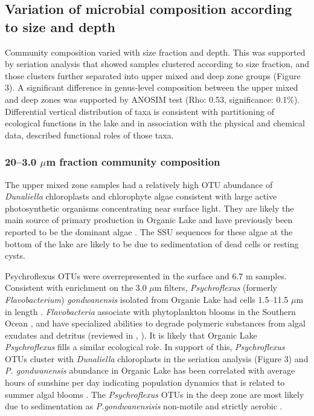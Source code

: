 \subsection{Variation of microbial composition according to size and depth}
Community composition varied with size fraction and depth. 
This was supported by seriation analysis that showed samples clustered according to size fraction, and those clusters further separated into upper mixed and deep zone groups (Figure 3). 
A significant difference in genus-level composition between the upper mixed and deep zones was supported by \ac{ANOSIM} test (Rho: 0.53, significance: 0.1\%). 
Differential vertical distribution of taxa is consistent with partitioning of ecological functions in the lake and in association with the physical and chemical data, described functional roles of those taxa.

\subsubsection{20--3.0 $\mu$m fraction community composition}
The upper mixed zone samples had a relatively high \ac{OTU} abundance of \emph{Dunaliella} chloroplasts and chlorophyte algae consistent with large active photosynthetic organisms concentrating near surface light. 
They are likely the main source of primary production in Organic Lake and have previously been reported to be the dominant algae \cite{Franzmann1987b}. 
The \ac{SSU} sequences for these algae at the bottom of the lake are likely to be due to sedimentation of dead cells or resting cysts.

Psychroflexus \acp{OTU} were overrepresented in the surface and 6.7 m samples. 
Consistent with enrichment on the 3.0 $\mu$m filters, \emph{Psychroflexus} (formerly \emph{Flavobacterium}) \emph{gondwanensis} \cite{Bowman1998} isolated from Organic Lake \cite{Franzmann1987b} had cells 1.5--11.5 $\mu$m in length \cite{Dobson1991}. 
\emph{Flavobacteria} associate with phytoplankton blooms in the Southern Ocean \cite{Abell2005a, Abell2005b, Williams2012b}, and have specialized abilities to degrade polymeric substances from algal exudates and detritus (reviewed in \citet{Kirchman2002}, \cite{Williams2012b}). 
It is likely that Organic Lake \emph{Psychroflexus} fills a similar ecological role. 
In support of this, \emph{Psychroflexus} \acp{OTU} cluster with \emph{Dunaliella} chloroplasts in the seriation analysis (Figure 3) and \emph{P. gondwanensis} abundance in Organic Lake has been correlated with average hours of sunshine per day indicating population dynamics that is related to summer algal blooms \cite{James1994}. 
The \emph{Psychroflexus} \acp{OTU} in the deep zone are most likely due to sedimentation as \emph{P.gondwanensisis} non-motile and strictly aerobic \cite{Dobson1991}.


